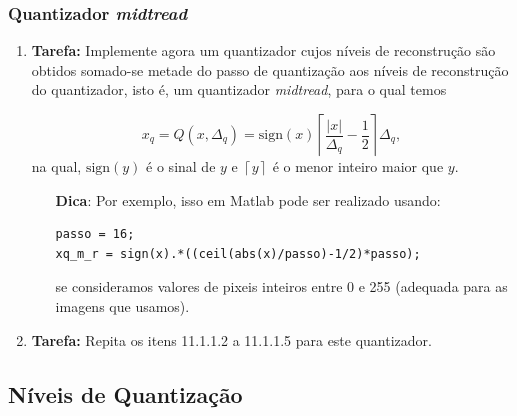 \documentclass[11pt]{article}
\begin{document}
\subsubsection{Quantizador \emph{midtread}}

\begin{enumerate}

\item \textbf{Tarefa:} Implemente agora um quantizador cujos níveis de reconstrução são obtidos somado-se metade do passo de quantização aos níveis de reconstrução do quantizador, isto é, um quantizador \emph{midtread}, para o qual temos

\begin{equation}
x_q = Q(x,\Delta_q) = \textrm{sign}(x)\left \lceil \frac{|x|}{\Delta_q} - \frac{1}{2} \right \rceil \Delta_q,
\end{equation}
na qual,  $\textrm{sign}(y)$ é o sinal de $y$ e $\left \lceil y \right \rceil$ é o menor inteiro maior que $y$. 

\begin{itemize}
\item[\textbf{Dica}:] Por exemplo, isso em \textsf{Matlab} pode ser realizado usando:

\begin{verbatim}
passo = 16;
xq_m_r = sign(x).*((ceil(abs(x)/passo)-1/2)*passo);
\end{verbatim}
\noindent se consideramos valores de pixeis inteiros entre 0 e 255 (adequada para as imagens que usamos). 

\end{itemize}

\item \textbf{Tarefa:} Repita os itens 11.1.1.2 a 11.1.1.5 para este quantizador.

\end{enumerate}

\subsection{Níveis de Quantização}
\end{document}

